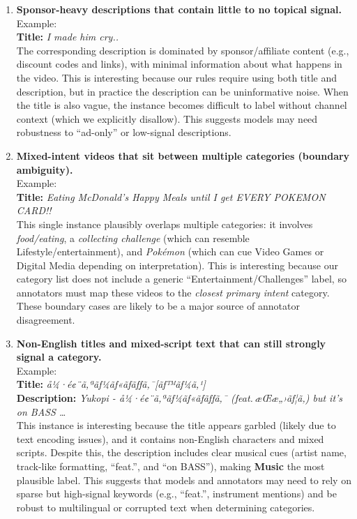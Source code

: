 \documentclass[11pt]{article}
\begin{document}
\begin{enumerate}
  \item \textbf{Sponsor-heavy descriptions that contain little to no topical signal.} \\
  Example: \\
  \textbf{Title:} \emph{I made him cry..}\\
  The corresponding description is dominated by sponsor/affiliate content (e.g., discount codes and links), with minimal information about what happens in the video. This is interesting because our rules require using both title and description, but in practice the description can be uninformative noise. When the title is also vague, the instance becomes difficult to label without channel context (which we explicitly disallow). This suggests models may need robustness to “ad-only” or low-signal descriptions.

  \item \textbf{Mixed-intent videos that sit between multiple categories (boundary ambiguity).}\\
  Example: \\
  \textbf{Title:} \emph{Eating McDonald's Happy Meals until I get EVERY POKEMON CARD!!}\\
  This single instance plausibly overlaps multiple categories: it involves \emph{food/eating}, a \emph{collecting challenge} (which can resemble Lifestyle/entertainment), and \emph{Pok\'emon} (which can cue Video Games or Digital Media depending on interpretation). This is interesting because our category list does not include a generic “Entertainment/Challenges” label, so annotators must map these videos to the \emph{closest primary intent} category. These boundary cases are likely to be a major source of annotator disagreement.

  \item \textbf{Non-English titles and mixed-script text that can still strongly signal a category.}\\
  Example: \\
  \textbf{Title:} \emph{å¼·é¢¨ã‚ªãƒ¼ãƒ«ãƒãƒƒã‚¯[ãƒ™ãƒ¼ã‚¹]}\\
  \textbf{Description:} \emph{Yukopi - å¼·é¢¨ã‚ªãƒ¼ãƒ«ãƒãƒƒã‚¯ (feat.\,æ­Œæ„›ãƒ¦ã‚­) but it's on BASS \ldots}\\
  This instance is interesting because the title appears garbled (likely due to text encoding issues), and it contains non-English characters and mixed scripts. Despite this, the description includes clear musical cues (artist name, track-like formatting, ``feat.'', and ``on BASS''), making \textbf{Music} the most plausible label. This suggests that models and annotators may need to rely on sparse but high-signal keywords (e.g., ``feat.'', instrument mentions) and be robust to multilingual or corrupted text when determining categories.


\end{enumerate}
\end{document}
